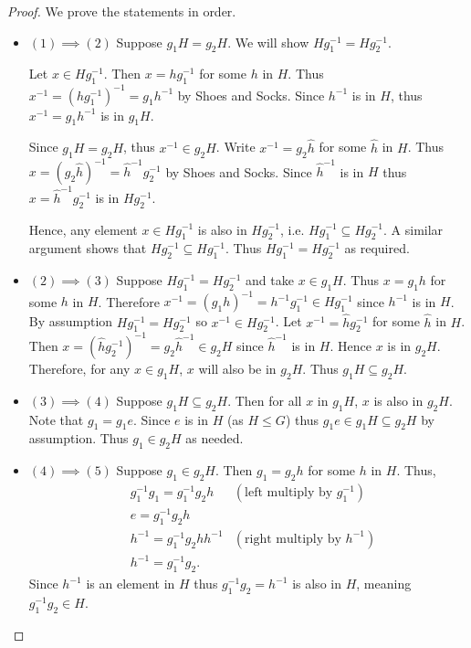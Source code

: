 \begin{proof}
    We prove the statements in order.

    \begin{itemize}
        \item $\boxed{(1) \implies (2)}$ Suppose $g_1H = g_2H$. We will show $Hg_1^{-1} = Hg_2^{-1}$.

        Let $x \in Hg_1^{-1}$. Then $x = hg_1^{-1}$ for some $h$ in $H$. Thus $x^{-1} = \left(hg_1^{-1}\right)^{-1} = g_1h^{-1}$ by Shoes and Socks. Since $h^{-1}$ is in $H$, thus $x^{-1} = g_1h^{-1}$ is in $g_1H$.

        Since $g_1H = g_2H$, thus $x^{-1} \in g_2H$. Write $x^{-1} = g_2\hat{h}$ for some $\hat{h}$ in $H$. Thus $x = (g_2\hat{h})^{-1} = \hat{h}^{-1}g_2^{-1}$ by Shoes and Socks. Since $\hat{h}^{-1}$ is in $H$ thus $x = \hat{h}^{-1}g_2^{-1}$ is in $Hg_2^{-1}$.

        Hence, any element $x \in Hg_1^{-1}$ is also in $Hg_2^{-1}$, i.e. $Hg_1^{-1} \subseteq Hg_2^{-1}$. A similar argument shows that $Hg_2^{-1} \subseteq Hg_1^{-1}$. Thus $Hg_1^{-1} = Hg_2^{-1}$ as required.

        \item $\boxed{(2) \implies (3)}$ Suppose $Hg_1^{-1} = Hg_2^{-1}$ and take $x \in g_1H$. Thus $x = g_1h$ for some $h$ in $H$. Therefore $x^{-1} = (g_1h)^{-1} = h^{-1}g_1^{-1} \in Hg_1^{-1}$ since $h^{-1}$ is in $H$. By assumption $Hg_1^{-1} = Hg_2^{-1}$ so $x^{-1} \in Hg_2^{-1}$. Let $x^{-1} = \hat{h}g_2^{-1}$ for some $\hat{h}$ in $H$. Then $x = \left(\hat{h}g_2^{-1}\right)^{-1} = g_2\hat{h}^{-1} \in g_2H$ since $\hat{h}^{-1}$ is in $H$. Hence $x$ is in $g_2H$. Therefore, for any $x \in g_1H$, $x$ will also be in $g_2H$. Thus $g_1H \subseteq g_2H$.

        \item $\boxed{(3) \implies (4)}$
        Suppose $g_1H \subseteq g_2H$. Then for all $x$ in $g_1H$, $x$ is also in $g_2H$. Note that $g_1 = g_1e$. Since $e$ is in $H$ (as $H \leq G$) thus $g_1e \in g_1H \subseteq g_2H$ by assumption. Thus $g_1 \in g_2H$ as needed.

        \item $\boxed{(4) \implies (5)}$
        Suppose $g_1 \in g_2H$. Then $g_1 = g_2h$ for some $h$ in $H$. Thus,
        \begin{align*}
            &g_1^{-1}g_1 = g_1^{-1}g_2h & (\text{left multiply by } g_1^{-1})\\
            &e = g_1^{-1}g_2h\\
            &h^{-1} = g_1^{-1}g_2hh^{-1} & (\text{right multiply by } h^{-1})\\
            &h^{-1} = g_1^{-1}g_2.
        \end{align*}
        Since $h^{-1}$ is an element in $H$ thus $g_1^{-1}g_2 = h^{-1}$ is also in $H$, meaning $g_1^{-1}g_2 \in H$.


\end{itemize}
\end{proof}
